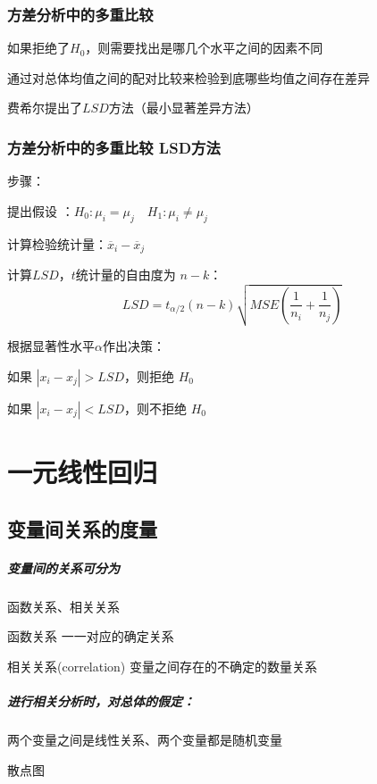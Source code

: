 \documentclass[UTF8,10pt]{book}
\begin{document}
\subsection{方差分析中的多重比较}	
如果拒绝了$H_0$，则需要找出是哪几个水平之间的因素不同 

通过对总体均值之间的配对比较来检验到底哪些均值之间存在差异 

费希尔提出了$ LSD $方法（最小显著差异方法）

\subsection{方差分析中的多重比较 LSD方法}	
步骤： 

提出假设 ：$ H_0:\mu_i = \mu_j \quad H_1:\mu_i \neq \mu_j $

计算检验统计量：$\overline{x}_i-\overline{x}_j$

计算$LSD$，$t$统计量的自由度为
$n-k$： 
$$ LSD = t_{\alpha / 2}(n-k) \sqrt{MSE \left( \frac{1}{n_i}+\frac{1}{n_j}\right)} $$ 

根据显著性水平$\alpha$作出决策：

如果 $ |x_i - x_j| > LSD$，则拒绝 $ H_0$

如果 $ |x_i - x_j| < LSD$，则不拒绝 $ H_0$



\clearpage

\chapter{一元线性回归}


\section{变量间关系的度量}

\paragraph{变量间的关系可分为}	函数关系、相关关系

函数关系	一一对应的确定关系

相关关系(correlation)	变量之间存在的不确定的数量关系

\paragraph{进行相关分析时，对总体的假定：}	
两个变量之间是线性关系、两个变量都是随机变量

散点图	
\end{document}
